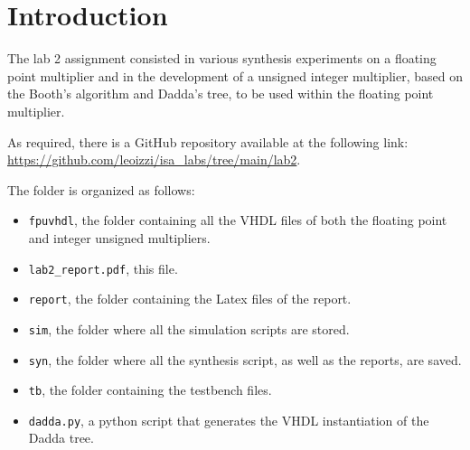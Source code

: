 \chapter{Introduction}

The lab 2 assignment consisted in various synthesis experiments on a floating point multiplier and in the development of a unsigned integer multiplier,
based on the Booth's algorithm and Dadda's tree, to be used within the floating point multiplier.

As required, there is a GitHub repository available at the following link: \url{https://github.com/leoizzi/isa_labs/tree/main/lab2}.

The folder is organized as follows:

\begin{itemize}
    \item \verb|fpuvhdl|, the folder containing all the VHDL files of both the floating point and integer unsigned multipliers.
    \item \verb|lab2_report.pdf|, this file.
    \item \verb|report|, the folder containing the Latex files of the report.
    \item \verb|sim|, the folder where all the simulation scripts are stored.
    \item \verb|syn|, the folder where all the synthesis script, as well as the reports, are saved.
    \item \verb|tb|, the folder containing the testbench files.
    \item \verb|dadda.py|, a python script that generates the VHDL instantiation of the Dadda tree.
\end{itemize}